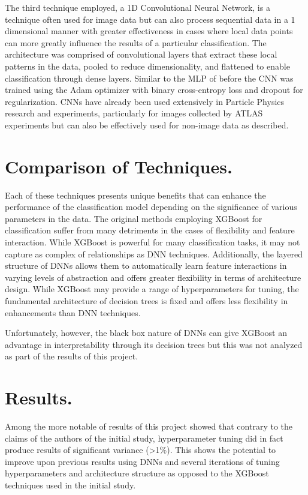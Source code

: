 \documentclass[twocolumn]{webofc}
\begin{document}
The third technique employed, a 1D Convolutional Neural Network, is a technique often used for image data but can also process sequential data in a 1 dimensional manner with greater effectiveness in cases where local data points can more greatly influence the results of a particular classification. The architecture was comprised of convolutional layers that extract these local patterns in the data, pooled to reduce dimensionality, and flattened to enable classification through dense layers. Similar to the MLP of before the CNN was trained using the Adam optimizer with binary cross-entropy loss and dropout for regularization. CNNs have already been used extensively in Particle Physics research and experiments, particularly for images collected by ATLAS experiments but can also be effectively used for non-image data as described.\cite{Ayyar_2020}

\section*{Comparison of Techniques.}\label{sec:readme}
Each of these techniques presents unique benefits that can enhance the performance of the classification model depending on the significance of various parameters in the data. The original methods employing XGBoost for classification suffer from many detriments in the cases of flexibility and feature interaction. While XGBoost is powerful for many classification tasks, it may not capture as complex of relationships as DNN techniques. Additionally, the layered structure of DNNs allows them to automatically learn feature interactions in varying levels of abstraction and offers greater flexibility in terms of architecture design. While XGBoost may provide a range of hyperparameters for tuning, the fundamental architecture of decision trees is fixed and offers less flexibility in enhancements than DNN techniques.

Unfortunately, however, the black box nature of DNNs can give XGBoost an advantage in interpretability through its decision trees but this was not analyzed as part of the results of this project.

\section*{Results.}\label{sec:readme}
Among the more notable of results of this project showed that contrary to the claims of the authors of the initial study, hyperparameter tuning did in fact produce results of significant variance (>1\%). This shows the potential to improve upon previous results using DNNs and several iterations of tuning hyperparameters and architecture structure as opposed to the XGBoost techniques used in the initial study.
\end{document}
